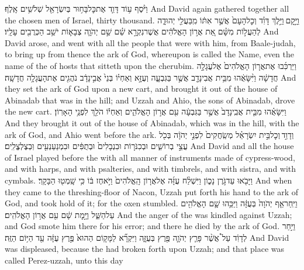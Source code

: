 {וַיֹּ֨סֶף ע֥וֹד דָּוִ֛ד אֶת\maqqaf כׇּל\maqqaf בָּח֥וּר בְּיִשְׂרָאֵ֖ל שְׁלֹשִׁ֥ים אָֽלֶף׃}
{And David again gathered together all the chosen men of Israel, thirty thousand.}
{וַיָּ֣קׇם \legarmeh  וַיֵּ֣לֶךְ דָּוִ֗ד וְכׇל\maqqaf הָעָם֙ אֲשֶׁ֣ר אִתּ֔וֹ מִֽבַּעֲלֵ֖י יְהוּדָ֑ה לְהַעֲל֣וֹת מִשָּׁ֗ם אֵ֚ת אֲר֣וֹן הָאֱלֹהִ֔ים אֲשֶׁר\maqqaf נִקְרָ֣א שֵׁ֗ם שֵׁ֣ם יְהֹוָ֧ה צְבָא֛וֹת יֹשֵׁ֥ב הַכְּרֻבִ֖ים עָלָֽיו׃}
{And David arose, and went with all the people that were with him, from Baale-judah, to bring up from thence the ark of God, whereupon is called the Name, even the name of the \lord\space of hosts that sitteth upon the cherubim.}
{וַיַּרְכִּ֜בוּ אֶת\maqqaf אֲר֤וֹן הָאֱלֹהִים֙ אֶל\maqqaf עֲגָלָ֣ה חֲדָשָׁ֔ה וַיִּ֨שָּׂאֻ֔הוּ מִבֵּ֥ית אֲבִינָדָ֖ב אֲשֶׁ֣ר בַּגִּבְעָ֑ה וְעֻזָּ֣א וְאַחְי֗וֹ בְּנֵי֙ אֲבִ֣ינָדָ֔ב נֹהֲגִ֖ים אֶת\maqqaf הָעֲגָלָ֥ה חֲדָשָֽׁה׃}
{And they set the ark of God upon a new cart, and brought it out of the house of Abinadab that was in the hill; and Uzzah and Ahio, the sons of Abinadab, drove the new cart.}
{וַיִּשָּׂאֻ֗הוּ מִבֵּ֤ית אֲבִֽינָדָב֙ אֲשֶׁ֣ר בַּגִּבְעָ֔ה עִ֖ם אֲר֣וֹן הָאֱלֹהִ֑ים וְאַחְי֕וֹ הֹלֵ֖ךְ לִפְנֵ֥י הָאָרֽוֹן׃}
{And they brought it out of the house of Abinadab, which was in the hill, with the ark of God, and Ahio went before the ark.}
{וְדָוִ֣ד \legarmeh  וְכׇל\maqqaf בֵּ֣ית יִשְׂרָאֵ֗ל מְשַֽׂחֲקִים֙ לִפְנֵ֣י יְהֹוָ֔ה בְּכֹ֖ל עֲצֵ֣י בְרוֹשִׁ֑ים וּבְכִנֹּר֤וֹת וּבִנְבָלִים֙ וּבְתֻפִּ֔ים וּבִמְנַעַנְעִ֖ים וּֽבְצֶלְצֱלִֽים׃}
{And David and all the house of Israel played before the \lord\space with all manner of instruments made of cypress-wood, and with harps, and with psalteries, and with timbrels, and with sistra, and with cymbals.}
{וַיָּבֹ֖אוּ עַד\maqqaf גֹּ֣רֶן נָכ֑וֹן וַיִּשְׁלַ֨ח עֻזָּ֜ה אֶל\maqqaf אֲר֤וֹן הָֽאֱלֹהִים֙ וַיֹּ֣אחֶז בּ֔וֹ כִּ֥י שָֽׁמְט֖וּ הַבָּקָֽר׃}
{And when they came to the threshing-floor of Nacon, Uzzah put forth his hand to the ark of God, and took hold of it; for the oxen stumbled.}
{וַיִּֽחַר\maqqaf אַ֤ף יְהֹוָה֙ בְּעֻזָּ֔ה וַיַּכֵּ֥הוּ שָׁ֛ם הָאֱלֹהִ֖ים עַל\maqqaf הַשַּׁ֑ל וַיָּ֣מׇת שָׁ֔ם עִ֖ם אֲר֥וֹן הָאֱלֹהִֽים׃}
{And the anger of the \lord\space was kindled against Uzzah; and God smote him there for his error; and there he died by the ark of God.}
{וַיִּ֣חַר לְדָוִ֔ד עַל֩ אֲשֶׁ֨ר פָּרַ֧ץ יְהֹוָ֛ה פֶּ֖רֶץ בְּעֻזָּ֑ה וַיִּקְרָ֞א לַמָּק֤וֹם הַהוּא֙ פֶּ֣רֶץ עֻזָּ֔ה עַ֖ד הַיּ֥וֹם הַזֶּֽה׃}
{And David was displeased, because the \lord\space had broken forth upon Uzzah; and that place was called Perez-uzzah, unto this day}

